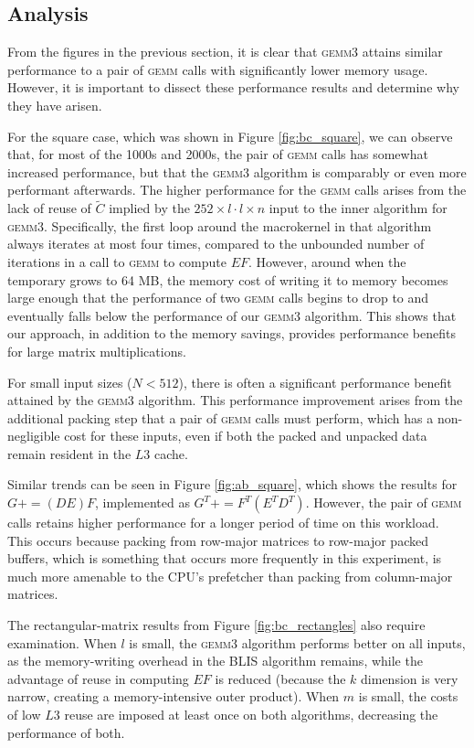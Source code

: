 \documentclass[12pt]{article}
\newcommand*{\pluseq}{\mathrel{{+}{=}}}
\newcommand*{\gemmt}{{\textsc{gemm3}}}
\newcommand*{\gemm}{{\textsc{gemm}}}
\begin{document}
\subsection{Analysis}
From the figures in the previous section, it is clear that \gemmt{} attains similar performance to a pair of \gemm{} calls with significantly lower memory usage.
However, it is important to dissect these performance results and determine why they have arisen.

For the square case, which was shown in Figure \ref{fig:bc_square}, we can observe that, for most of the 1000s and 2000s, the pair of \gemm{} calls has somewhat increased performance, but that the \gemmt{} algorithm is comparably or even more performant afterwards.
The higher performance for the \gemm{} calls arises from the lack of reuse of $\widetilde{C}$ implied by the $252 \times l \cdot l \times n$ input to the inner algorithm for \gemmt{}.
Specifically, the first loop around the macrokernel in that algorithm always iterates at most four times, compared to the unbounded number of iterations in a call to \gemm{} to compute $EF$.
However, around when the temporary grows to 64 MB, the memory cost of writing it to memory becomes large enough that the performance of two \gemm{} calls begins to drop to and eventually falls below the performance of our \gemmt{} algorithm.
This shows that our approach, in addition to the memory savings, provides performance benefits for large matrix multiplications.

For small input sizes ($N < 512$), there is often a significant performance benefit attained by the \gemmt{} algorithm.
This performance improvement arises from the additional packing step that a pair of \gemm{} calls must perform, which has a non-negligible cost for these inputs, even if both the packed and unpacked data remain resident in the $L3$ cache.

Similar trends can be seen in Figure \ref{fig:ab_square}, which shows the results for $G \pluseq (DE)F$, implemented as $G^T \pluseq F^T(E^TD^T)$.
However, the pair of \gemm{} calls retains higher performance for a longer period of time on this workload.
This occurs because packing from row-major matrices to row-major packed buffers, which is something that occurs more frequently in this experiment, is much more amenable to the CPU's prefetcher than packing from column-major matrices.

The rectangular-matrix results from Figure \ref{fig:bc_rectangles} also require examination.
When $l$ is small, the \gemmt{} algorithm performs better on all inputs, as the memory-writing overhead in the BLIS algorithm remains, while the advantage of reuse in computing $EF$ is reduced (because the $k$ dimension is very narrow, creating a memory-intensive outer product).
When $m$ is small, the costs of low $L3$ reuse are imposed at least once on both algorithms, decreasing the performance of both.
\end{document}
